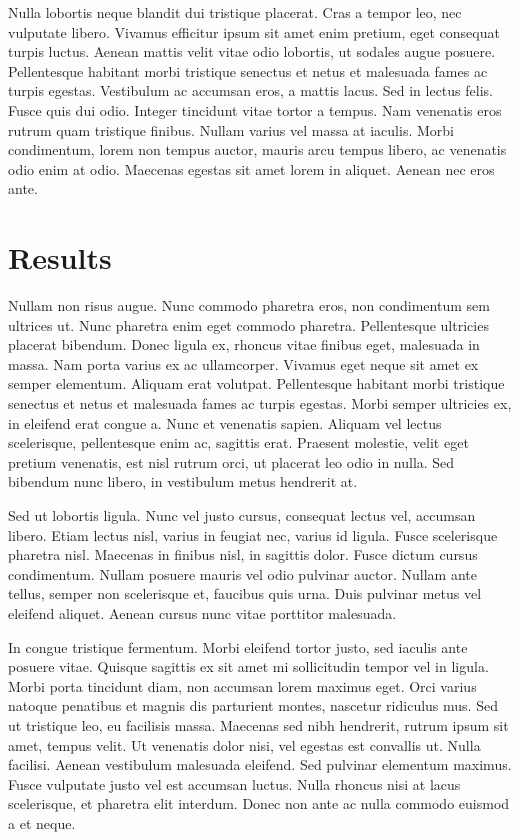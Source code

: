 \documentclass{article}
\begin{document}
Nulla lobortis neque blandit dui tristique placerat. Cras a tempor leo,
nec vulputate libero. Vivamus efficitur ipsum sit amet enim pretium,
eget consequat turpis luctus. Aenean mattis velit vitae odio lobortis,
ut sodales augue posuere. Pellentesque habitant morbi tristique senectus
et netus et malesuada fames ac turpis egestas. Vestibulum ac accumsan
eros, a mattis lacus. Sed in lectus felis. Fusce quis dui odio. Integer
tincidunt vitae tortor a tempus. Nam venenatis eros rutrum quam
tristique finibus. Nullam varius vel massa at iaculis. Morbi
condimentum, lorem non tempus auctor, mauris arcu tempus libero, ac
venenatis odio enim at odio. Maecenas egestas sit amet lorem in aliquet.
Aenean nec eros ante.

\hypertarget{results}{%
\section{Results}\label{results}}

Nullam non risus augue. Nunc commodo pharetra eros, non condimentum sem
ultrices ut. Nunc pharetra enim eget commodo pharetra. Pellentesque
ultricies placerat bibendum. Donec ligula ex, rhoncus vitae finibus
eget, malesuada in massa. Nam porta varius ex ac ullamcorper. Vivamus
eget neque sit amet ex semper elementum. Aliquam erat volutpat.
Pellentesque habitant morbi tristique senectus et netus et malesuada
fames ac turpis egestas. Morbi semper ultricies ex, in eleifend erat
congue a. Nunc et venenatis sapien. Aliquam vel lectus scelerisque,
pellentesque enim ac, sagittis erat. Praesent molestie, velit eget
pretium venenatis, est nisl rutrum orci, ut placerat leo odio in nulla.
Sed bibendum nunc libero, in vestibulum metus hendrerit at.

Sed ut lobortis ligula. Nunc vel justo cursus, consequat lectus vel,
accumsan libero. Etiam lectus nisl, varius in feugiat nec, varius id
ligula. Fusce scelerisque pharetra nisl. Maecenas in finibus nisl, in
sagittis dolor. Fusce dictum cursus condimentum. Nullam posuere mauris
vel odio pulvinar auctor. Nullam ante tellus, semper non scelerisque et,
faucibus quis urna. Duis pulvinar metus vel eleifend aliquet. Aenean
cursus nunc vitae porttitor malesuada.

In congue tristique fermentum. Morbi eleifend tortor justo, sed iaculis
ante posuere vitae. Quisque sagittis ex sit amet mi sollicitudin tempor
vel in ligula. Morbi porta tincidunt diam, non accumsan lorem maximus
eget. Orci varius natoque penatibus et magnis dis parturient montes,
nascetur ridiculus mus. Sed ut tristique leo, eu facilisis massa.
Maecenas sed nibh hendrerit, rutrum ipsum sit amet, tempus velit. Ut
venenatis dolor nisi, vel egestas est convallis ut. Nulla facilisi.
Aenean vestibulum malesuada eleifend. Sed pulvinar elementum maximus.
Fusce vulputate justo vel est accumsan luctus. Nulla rhoncus nisi at
lacus scelerisque, et pharetra elit interdum. Donec non ante ac nulla
commodo euismod a et neque.
\end{document}
